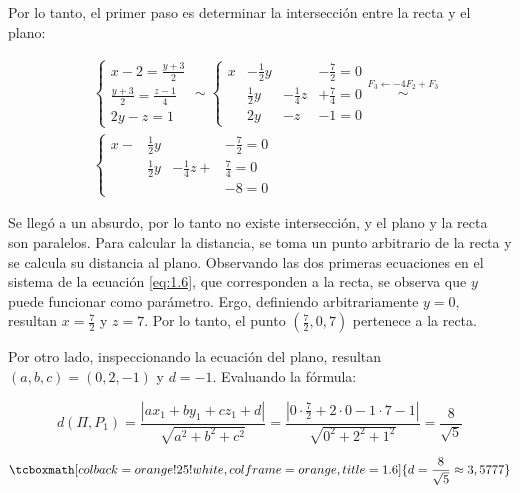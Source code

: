 \documentclass{article}
\begin{document}
Por lo tanto, el primer paso es determinar la intersección entre la recta y el plano:

\begin{subequations}
\begin{align}
& \left\{ \begin{array}{ll}
x-2 = \frac{y+3}{2} \\
\frac{y+3}{2} = \frac{z - 1}{4} \\
2y -z = 1
\end{array} \right. \sim \left\{ \begin{array}{lllr}
x&-\frac{1}{2}y & &- \frac{7}{2} = 0 \\
&\frac{1}{2}y &-\frac{1}{4}z &+ \frac{7}{4} = 0 \label{eq:1.6} \\
&2y &- z &- 1 = 0
\end{array} \right. \overset{F_3 \leftarrow -4 F_2 + F_3}{\sim} \\
& \left\{ \begin{array}{lllr}
x -&\frac{1}{2} y &&-\frac{7}{2} = 0 \\
&\frac{1}{2} y &-\frac{1}{4}z + &\frac{7}{4} = 0 \\
&&&-8 = 0
\end{array} \right.
\end{align}
\end{subequations}

Se llegó a un absurdo, por lo tanto no existe intersección, y el plano y la recta son paralelos. Para calcular la distancia, se toma un punto arbitrario de la recta y se calcula su distancia al plano. Observando las dos primeras ecuaciones en el sistema de la ecuación \ref{eq:1.6}, que corresponden a la recta, se observa que $y$ puede funcionar como parámetro. Ergo, definiendo arbitrariamente $y = 0$, resultan $x=\frac{7}{2}$ y $z=7$. Por lo tanto, el punto $(\frac{7}{2}, 0, 7)$ pertenece a la recta.

Por otro lado, inspeccionando la ecuación del plano, resultan $(a, b, c) = (0, 2, -1)$ y $d = -1$. Evaluando la fórmula:

\begin{equation}
d(\Pi, P_1) = \frac{|a x_1 + b y_1 + c z_1 + d|}{\sqrt{a^2 + b^2 + c^2}} = \frac{|0 \cdot \frac{7}{2} + 2 \cdot 0 -1 \cdot 7 - 1 |}{\sqrt{0^2 + 2^2 + 1^2}} = \frac{8}{\sqrt{5}}
\end{equation}

\begin{equation}
\tcboxmath[colback=orange!25!white,colframe=orange,title=1.6]
{ d = \frac{8}{\sqrt{5}} \approx 3,5777 }
\end{equation}
\end{document}
